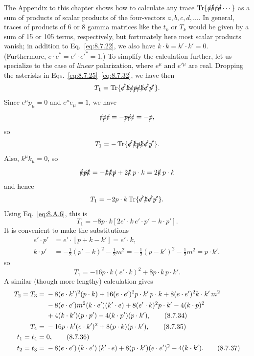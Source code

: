 The Appendix to this chapter shows how to calculate any trace
$\operatorname{Tr}\{\sl{a}\sl{b}\sl{c}\sl{d}\cdots\}$ as a sum of products
of scalar products of the four-vectors $a,b,c,d,\ldots$. In general, traces
of products of 6 or 8 gamma matrices like the $t_k$ or $T_k$ would be given by
a sum of 15 or 105 terms, respectively, but fortunately here most scalar
products vanish; in addition to Eq.~\eqref{eq:8.7.22}, we also have
$k\cdot k=k'\cdot k'=0$. (Furthermore,
$e\cdot e^*=e'\cdot e'^*=1$.) To simplify the calculation further, let us
specialize to the case of \emph{linear} polarization, where $e^\mu$ and
$e'{}^\mu$ are real. Dropping the asterisks in Eqs.~\eqref{eq:8.7.25}--\eqref{eq:8.7.32}, we
have then
\[
T_1=\operatorname{Tr}\{\sl{e'}\sl{k}\sl{e}\sl{p}\sl{e}\sl{k}\sl{e'}\sl{p'}\}.
\]
Since $e^\mu p_\mu=0$ and $e^\mu e_\mu=1$, we have
\[
\sl{e}\sl{p}\sl{e}=-\sl{p}\sl{e}\sl{e}=-\sl{p},
\]
so
\[
T_1=-\operatorname{Tr}\{\sl{e'}\sl{k}\sl{p}\sl{k}\sl{e'}\sl{p'}\}.
\]
Also, $k^\mu k_\mu=0$, so
\[
\sl{k}\sl{p}\sl{k}=-\sl{k}\sl{k}\sl{p}+2\sl{k}\,p\cdot k
=2\sl{k}\,p\cdot k
\]
and hence
\[
T_1=-2p\cdot k\operatorname{Tr}\{\sl{e'}\sl{k}\sl{e'}\sl{p'}\}.
\]
Using Eq.~\eqref{eq:8.A.6}, this is
\[
T_1=-8p\cdot k[2e'\cdot k\,e'\cdot p'-k\cdot p'].
\]
It is convenient to make the substitutions
\begin{align*}
e'\cdot p'&=e'\cdot[p+k-k']=e'\cdot k,\\
k\cdot p'&=-\tfrac12(p'-k)^2-\tfrac12m^2
=-\tfrac12(p-k')^2-\tfrac12m^2=p\cdot k',
\end{align*}
so
\begin{equation}
T_1=-16p\cdot k(e'\cdot k)^2+8p\cdot k\,p\cdot k'.
\tag{8.7.33}\label{eq:8.7.33}
\end{equation}
A similar (though more lengthy) calculation gives
\begin{align}
T_2=T_3={}&-8(e\cdot k')^2(p\cdot k)
+16(e\cdot e')^2p\cdot k'\,p\cdot k
+8(e\cdot e')^2k\cdot k'\,m^2
\notag\\
&-8(e\cdot e')m^2(k\cdot e')(k'\cdot e)
+8(e'\cdot k)^2p\cdot k'
-4(k\cdot p)^2
\notag\\
&+4(k\cdot k')(p\cdot p')-4(k\cdot p')(p\cdot k'),
\tag{8.7.34}\label{eq:8.7.34}\\
T_4={}&-16p\cdot k'(e\cdot k')^2+8(p\cdot k)(p\cdot k'),
\tag{8.7.35}\label{eq:8.7.35}\\
t_1=t_4={}&0,
\tag{8.7.36}\label{eq:8.7.36}\\
t_2=t_3={}&-8(e\cdot e')\,(k\cdot e')\,(k'\cdot e)
+8(p\cdot k')(e\cdot e')^2-4(k\cdot k').
\tag{8.7.37}\label{eq:8.7.37}
\end{align}
